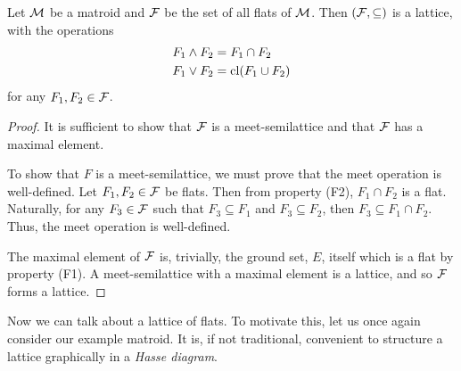 \documentclass[12pt,oneside]{../../sfsuthesis}
\begin{document}
\begin{lemma}\th\label{thm:flatLattice}
    Let \( \mathcal{M} \) be a matroid and \( \mathcal{F} \) be the set of all flats of \( \mathcal{M} \).
    Then \( ( \mathcal{F}, \subseteq) \) is a lattice, with the operations
    \begin{align*}
        F_1 \wedge F_2 & = F_1 \cap F_2      \\
        F_1 \vee F_2   & = \operatorname{cl}(F_1 \cup F_2)
    \end{align*}
    for any \( F_1, F_2 \in \mathcal{F} \).
\end{lemma}
\begin{proof}
    It is sufficient to show that \( \mathcal{F} \) is a meet-semilattice and that \( \mathcal{F} \) has a maximal element.

    To show that \( F \) is a meet-semilattice, we must prove that the meet operation is well-defined.
    Let \( F_1, F_2 \in \mathcal{F} \) be flats.
    Then from property (F2), \( F_1 \cap F_2 \) is a flat.
    Naturally, for any \( F_3 \in \mathcal{F} \) such that  \( F_3 \subseteq  F_1 \) and \( F_3 \subseteq F_2 \), then \( F_3 \subseteq F_1 \cap F_2 \).
    Thus, the meet operation is well-defined.

    The maximal element of \( \mathcal{F} \) is, trivially, the ground set, \( E \), itself which is a flat by property (F1).
    A meet-semilattice with a maximal element is a lattice, and so \( \mathcal{F} \) forms a lattice.
\end{proof}

Now we can talk about a lattice of flats.
To motivate this, let us once again consider our example matroid.
It is, if not traditional, convenient to structure a lattice graphically in a \emph{Hasse diagram}.
\end{document}
